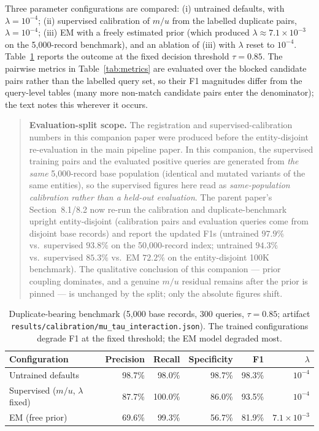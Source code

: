 \documentclass[11pt]{article}
\begin{document}
Three parameter configurations are compared: (i) untrained defaults, with $\lambda=10^{-4}$;
(ii) supervised calibration of $m/u$ from the labelled duplicate pairs, $\lambda=10^{-4}$;
(iii) EM with a freely estimated prior (which produced $\lambda\approx7.1\times10^{-3}$ on
the 5{,}000-record benchmark), and an ablation of (iii) with $\lambda$ reset to $10^{-4}$.
Table~\ref{tab:benchmark}
reports the outcome at the fixed decision threshold $\tau=0.85$. The pairwise metrics in
Table~\ref{tab:metrics} are evaluated over the blocked candidate pairs rather than the
labelled query set, so their F1 magnitudes differ from the query-level tables (many more
non-match candidate pairs enter the denominator); the text notes this wherever it occurs.

\begin{quotation}\noindent\textbf{Evaluation-split scope.} The registration and supervised-calibration
numbers in this companion paper were produced before the entity-disjoint re-evaluation in the
main pipeline paper. In this companion, the supervised training pairs and the evaluated
positive queries are generated from \emph{the same} 5{,}000-record base population (identical
and mutated variants of the same entities), so the supervised figures here read as
\emph{same-population calibration rather than a held-out evaluation}. The parent paper's
Section~8.1/8.2 now re-run the calibration and duplicate-benchmark upright entity-disjoint
(calibration pairs and evaluation queries come from disjoint base records) and report the
updated F1s (untrained $97.9\%$ vs.\ supervised $93.8\%$ on the 50{,}000-record index; untrained
$94.3\%$ vs.\ supervised $85.3\%$ vs.\ EM $72.2\%$ on the entity-disjoint 100K benchmark). The
qualitative conclusion of this companion --- prior coupling dominates, and a genuine $m/u$
residual remains after the prior is pinned --- is unchanged by the split; only the absolute
figures shift.
\end{quotation}

\begin{table}[h]
\centering
\caption{Duplicate-bearing benchmark (5{,}000 base records, 300 queries,
$\tau=0.85$; artifact \texttt{results/calibration/mu\_tau\_interaction.json}). The trained
configurations degrade F1 at the fixed threshold; the EM model degraded most.}
\label{tab:benchmark}
\begin{tabular}{lrrrrr}
\toprule
Configuration & Precision & Recall & Specificity & F1 & $\lambda$\\
\midrule
Untrained defaults & 98.7\% & 98.0\% & 98.7\% & 98.3\% & $10^{-4}$\\
Supervised ($m/u$, $\lambda$ fixed) & 87.7\% & 100.0\% & 86.0\% & 93.5\% & $10^{-4}$\\
EM (free prior) & 69.6\% & 99.3\% & 56.7\% & 81.9\% & $7.1\times10^{-3}$\\
\bottomrule
\end{tabular}
\end{table}
\end{document}
